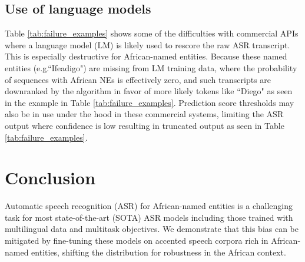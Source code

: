 \documentclass{INTERSPEECH2023}
\begin{document}
\subsection{Use of language models} 
Table \ref{tab:failure_examples} shows some of the difficulties with commercial APIs where a language model (LM) is likely used to rescore the raw ASR transcript. This is especially destructive for African-named entities. Because these named entities (e.g.``Ifeadigo") are missing from LM training data, where the probability of sequences with African NEs is effectively zero, and such transcripts are downranked by the algorithm in favor of more likely tokens like ``Diego" as seen in the example in Table \ref{tab:failure_examples}. Prediction score thresholds may also be in use under the hood in these commercial systems, limiting the ASR output where confidence is low resulting in truncated output as seen in Table \ref{tab:failure_examples}. 

\section{Conclusion}
Automatic speech recognition (ASR) for African-named entities is a challenging task for most state-of-the-art (SOTA) ASR models including those trained with multilingual data and multitask objectives. We demonstrate that this bias can be mitigated by fine-tuning these models on accented speech corpora rich in African-named entities, shifting the distribution for robustness in the African context.




\end{document}
